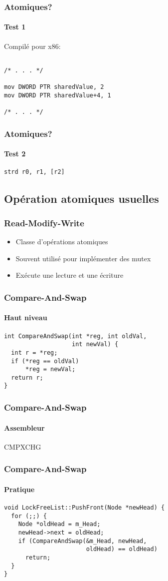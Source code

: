 \documentclass{beamer}
\begin{document}
\begin{frame}[fragile]
\frametitle{Atomiques?}
\framesubtitle{Test 1}
Compilé pour x86:
\begin{lstlisting}

/* . . . */

mov	DWORD PTR sharedValue, 2
mov	DWORD PTR sharedValue+4, 1

/* . . . */
\end{lstlisting}
\end{frame}

\begin{frame}[fragile]
\frametitle{Atomiques?}
\framesubtitle{Test 2}
\begin{lstlisting}
strd r0, r1, [r2]
\end{lstlisting}
\end{frame}

\subsection{Opération atomiques usuelles}
\begin{frame}
\frametitle{Read-Modify-Write}
\begin{itemize}
\item Classe d'opérations atomiques
\item Souvent utilisé pour implémenter des mutex
\item Exécute une lecture et une écriture
\end{itemize}
\end{frame}

\begin{frame}[fragile]
\frametitle{Compare-And-Swap}
\framesubtitle{Haut niveau}
\begin{lstlisting}
int CompareAndSwap(int *reg, int oldVal,
                   int newVal) {
  int r = *reg;
  if (*reg == oldVal)
      *reg = newVal;
  return r;
}
\end{lstlisting}
\end{frame}

\begin{frame}[fragile]
\frametitle{Compare-And-Swap}
\framesubtitle{Assembleur}
\begin{center}
\Huge CMPXCHG
\end{center}
\end{frame}

\begin{frame}[fragile]
\frametitle{Compare-And-Swap}
\framesubtitle{Pratique}
\begin{lstlisting}
void LockFreeList::PushFront(Node *newHead) {
  for (;;) {
    Node *oldHead = m_Head;
    newHead->next = oldHead;
    if (CompareAndSwap(&m_Head, newHead, 
                       oldHead) == oldHead)
      return;
  }
}
\end{lstlisting}
\end{frame}
\end{document}
